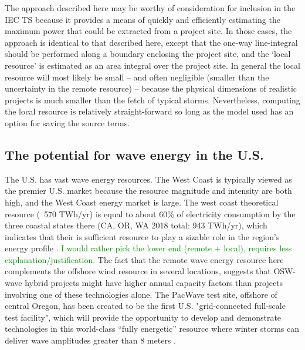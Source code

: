 The approach described here may be worthy of consideration for inclusion in the IEC TS because it provides a means of quickly and efficiently estimating the maximum power that could be extracted from a project site. In those cases, the approach is identical to that described here, except that the one-way line-integral should be performed along a boundary enclosing the project site, and the `local resource' is estimated as an area integral over the project site. In general the local resource will most likely be small -- and often negligible (smaller than the uncertainty in the remote resource) -- because the physical dimensions of realistic projects is much smaller than the fetch of typical storms. Nevertheless, computing the local resource is relatively straight-forward so long as the model used has an option for saving the source terms.

\subsection{The potential for wave energy in the U.S.}


The U.S. has vast wave energy resources. The West Coast is typically viewed as the premier U.S. market because the resource magnitude and intensity are both high, and the West Coast energy market is large. The west coast theoretical resource (~570 TWh/yr) is equal to about 60\% of electricity consumption by the three coastal states there (CA, OR, WA 2018 total: 943 TWh/yr), which indicates that their is sufficient resource to play a sizable role in the region's energy profile \citep{energyinformationadministrationStateEnergyConsumption2020}.  
\textcolor{green}{I would rather pick the lower end (remote + local), requires less explanation/justification.}
The fact that the remote wave energy resource here complements the offshore wind resource in several locations, suggests that OSW-wave hybrid projects might have higher annual capacity factors than projects involving one of these technologies alone. The PacWave test site, offshore of central Oregon, has been created to be the first U.S. "grid-connected full-scale test facility", which will provide the opportunity to develop and demonstrate technologies in this world-class ``fully energetic'' resource where winter storms can deliver wave amplitudes greater than 8 meters \citep[e.g.][]{allan_climate_2006}.

